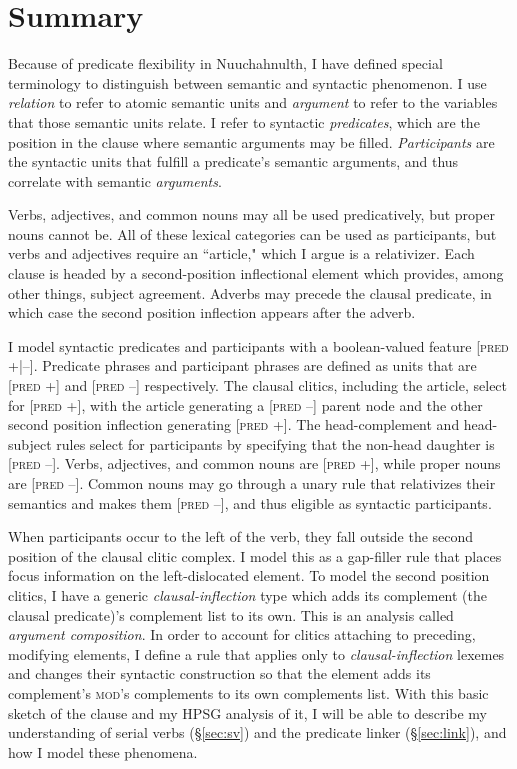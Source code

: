 \section{Summary} \label{sec:clause:summary}

Because of predicate flexibility in Nuuchahnulth, I have defined special terminology to distinguish between semantic and syntactic phenomenon. I use \textit{relation} to refer to atomic semantic units and \textit{argument} to refer to the variables that those semantic units relate. I refer to syntactic \textit{predicates}, which are the position in the clause where semantic arguments may be filled. \textit{Participants} are the syntactic units that fulfill a predicate's semantic arguments, and thus correlate with semantic \textit{arguments}.

Verbs, adjectives, and common nouns may all be used predicatively, but proper nouns cannot be. All of these lexical categories can be used as participants, but verbs and adjectives require an ``article," which I argue is a relativizer. Each clause is headed by a second-position inflectional element which provides, among other things, subject agreement. Adverbs may precede the clausal predicate, in which case the second position inflection appears after the adverb.

I model syntactic predicates and participants with a boolean-valued feature [\textsc{pred} +|--]. Predicate phrases and participant phrases are defined as units that are [\textsc{pred} +] and [\textsc{pred} --] respectively. The clausal clitics, including the article, select for [\textsc{pred} +], with the article generating a [\textsc{pred} --] parent node and the other second position inflection generating [\textsc{pred} +]. The head-complement and head-subject rules select for participants by specifying that the non-head daughter is [\textsc{pred} --]. Verbs, adjectives, and common nouns are [\textsc{pred} +], while proper nouns are [\textsc{pred} --]. Common nouns may go through a unary rule that relativizes their semantics and makes them [\textsc{pred} --], and thus eligible as syntactic participants.

When participants occur to the left of the verb, they fall outside the second position of the clausal clitic complex. I model this as a gap-filler rule that places focus information on the left-dislocated element. To model the second position clitics, I have a generic \textit{clausal-inflection} type which adds its complement (the clausal predicate)'s complement list to its own. This is an analysis called \textit{argument composition}. In order to account for clitics attaching to preceding, modifying elements, I define a rule that applies only to \textit{clausal-inflection} lexemes and changes their syntactic construction so that the element adds its complement's \textsc{mod}'s complements to its own complements list. With this basic sketch of the clause and my HPSG analysis of it, I will be able to describe my understanding of serial verbs (\S\ref{sec:sv}) and the predicate linker (\S\ref{sec:link}), and how I model these phenomena.
\